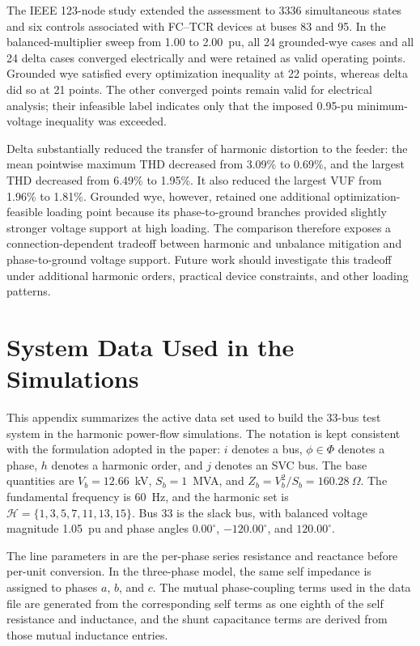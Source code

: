 \documentclass[journal]{IEEEtran}
\begin{document}
The IEEE 123-node study extended the assessment to 3336 simultaneous states
and six controls associated with FC--TCR devices at buses 83 and 95. In the
balanced-multiplier sweep from 1.00 to 2.00~pu, all 24 grounded-wye cases and
all 24 delta cases converged electrically and were retained as valid operating
points. Grounded wye satisfied every optimization inequality at 22 points,
whereas delta did so at 21 points. The other converged points remain valid for
electrical analysis; their infeasible label indicates only that the imposed
0.95-pu minimum-voltage inequality was exceeded.

Delta substantially reduced the transfer of harmonic distortion to the feeder:
the mean pointwise maximum THD decreased from 3.09\% to 0.69\%, and the largest
THD decreased from 6.49\% to 1.95\%. It also reduced the largest VUF from
1.96\% to 1.81\%. Grounded wye, however, retained one additional
optimization-feasible loading point because its phase-to-ground branches
provided slightly stronger voltage support at high loading. The comparison
therefore exposes a connection-dependent tradeoff between harmonic and
unbalance mitigation and phase-to-ground voltage support. Future work should
investigate this tradeoff under additional harmonic orders, practical device
constraints, and other loading patterns.






\appendices
\section{System Data Used in the Simulations}
\label{app:system_data}

This appendix summarizes the active data set used to build the 33-bus test
system in the harmonic power-flow simulations. The notation is kept consistent
with the formulation adopted in the paper: $i$ denotes a bus, $\phi\in\Phi$
denotes a phase, $h$ denotes a harmonic order, and $j$ denotes an SVC bus. The
base quantities are $V_b=12.66$~kV, $S_b=1$~MVA, and
$Z_b=V_b^2/S_b=160.28~\Omega$. The fundamental frequency is 60~Hz, and the
harmonic set is $\mathcal{H}=\{1,3,5,7,11,13,15\}$. Bus 33 is the slack bus,
with balanced voltage magnitude 1.05~pu and phase angles $0.00^\circ$,
$-120.00^\circ$, and $120.00^\circ$.

The line parameters in \cite{dolatabadi2021} are the per-phase
series resistance and reactance before per-unit conversion. In the three-phase
model, the same self impedance is assigned to phases $a$, $b$, and $c$. The
mutual phase-coupling terms used in the data file are generated from the
corresponding self terms as one eighth of the self resistance and inductance,
and the shunt capacitance terms are derived from those mutual inductance
entries.
\end{document}
